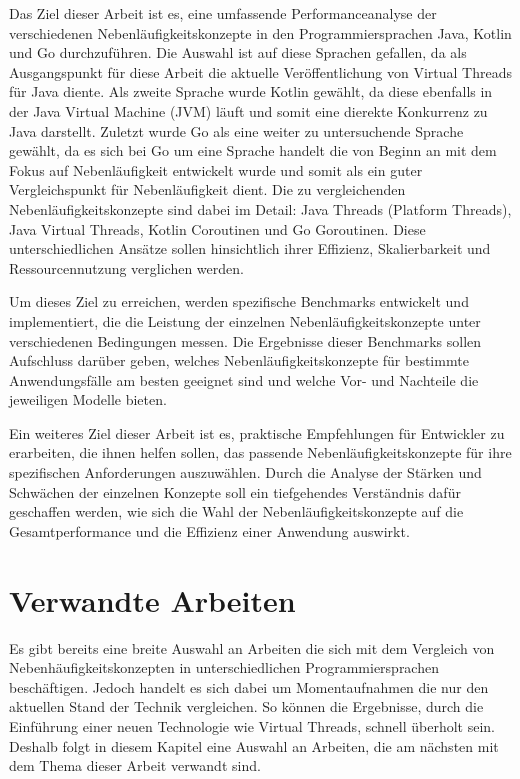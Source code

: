 \documentclass[fontsize=12pt,paper=a4,twoside=semi,parskip=half-,headsepline,headinclude]{scrreprt}
\begin{document}
Das Ziel dieser Arbeit ist es, eine umfassende Performanceanalyse der verschiedenen Nebenläufigkeitskonzepte in den Programmiersprachen Java, Kotlin und Go durchzuführen. Die Auswahl ist auf diese Sprachen gefallen, da als Ausgangspunkt für diese Arbeit die aktuelle Veröffentlichung von Virtual Threads für Java diente. Als zweite Sprache wurde Kotlin gewählt, da diese ebenfalls in der Java Virtual Machine (JVM) läuft und somit eine dierekte Konkurrenz zu Java darstellt. Zuletzt wurde Go als eine weiter zu untersuchende Sprache gewählt, da es sich bei Go um eine Sprache handelt die von Beginn an mit dem Fokus auf Nebenläufigkeit entwickelt wurde und somit als ein guter Vergleichspunkt für Nebenläufigkeit dient. Die zu vergleichenden Nebenläufigkeitskonzepte sind dabei im Detail: Java Threads (Platform Threads), Java Virtual Threads, Kotlin Coroutinen und Go Goroutinen. Diese unterschiedlichen Ansätze sollen hinsichtlich ihrer Effizienz, Skalierbarkeit und Ressourcennutzung verglichen werden.

Um dieses Ziel zu erreichen, werden spezifische Benchmarks entwickelt und implementiert, die die Leistung der einzelnen Nebenläufigkeitskonzepte unter verschiedenen Bedingungen messen. Die Ergebnisse dieser Benchmarks sollen Aufschluss darüber geben, welches Nebenläufigkeitskonzepte für bestimmte Anwendungsfälle am besten geeignet sind und welche Vor- und Nachteile die jeweiligen Modelle bieten.

Ein weiteres Ziel dieser Arbeit ist es, praktische Empfehlungen für Entwickler zu erarbeiten, die ihnen helfen sollen, das passende Nebenläufigkeitskonzepte für ihre spezifischen Anforderungen auszuwählen. Durch die Analyse der Stärken und Schwächen der einzelnen Konzepte soll ein tiefgehendes Verständnis dafür geschaffen werden, wie sich die Wahl der Nebenläufigkeitskonzepte auf die Gesamtperformance und die Effizienz einer Anwendung auswirkt.

\section{Verwandte Arbeiten}

Es gibt bereits eine breite Auswahl an Arbeiten die sich mit dem Vergleich von Nebenhäufigkeitskonzepten in unterschiedlichen Programmiersprachen beschäftigen. Jedoch handelt es sich dabei um Momentaufnahmen die nur den aktuellen Stand der Technik vergleichen. So können die Ergebnisse, durch die Einführung einer neuen Technologie wie Virtual Threads, schnell überholt sein. Deshalb folgt in diesem Kapitel eine Auswahl an Arbeiten, die am nächsten mit dem Thema dieser Arbeit verwandt sind.
\end{document}
